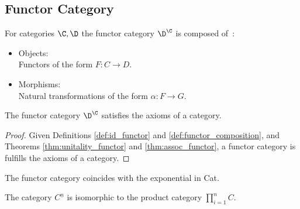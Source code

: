 \subsection*{Functor Category}
\begin{definition}
  For categories $\C, \D$ the functor category $\D^\C$ is composed
  of~\parencite[p.~30]{leinster:basic_category_theory}:

  \begin{itemize}
    \item Objects:\\
      Functors of the form $F:C\to D$.
    \item Morphisms:\\
      Natural transformations of the form $\alpha:F\to G$.
  \end{itemize}
\end{definition}

\begin{theorem}
  The functor category $\D^\C$ satisfies the axioms of a category.

  \begin{proof}
    Given Definitions \ref{def:id_functor} and \ref{def:functor_composition},
    and Theorems \ref{thm:unitality_functor} and \ref{thm:assoc_functor}, a
    functor category is fulfills the axioms of a category.
  \end{proof}
\end{theorem}

\begin{remark}
  The functor category coincides with the exponential in Cat.
\end{remark}

\begin{remark}
  The category $C^{\underline{n}}$ is isomorphic to the product category
  $\prod_{i=1}^n C$.
\end{remark}